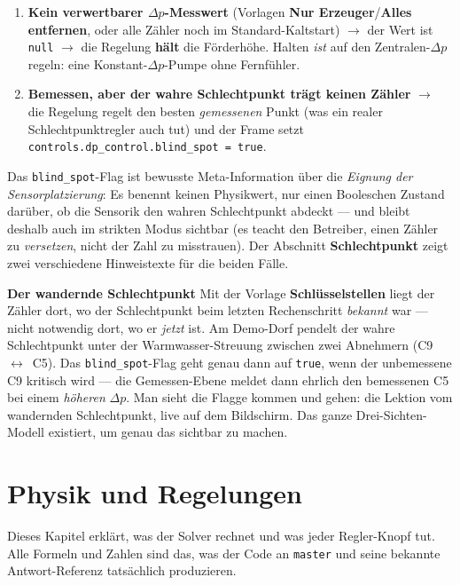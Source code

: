 \documentclass[11pt,a4paper,parskip=half]{scrreprt}
\newcommand{\ui}[1]{\textsf{\bfseries #1}}
\newenvironment{beispiel}[1][Beispiel]
  {\par\medskip{\color{bsp}\hrule height 0.8pt}\nopagebreak\smallskip
   \noindent\textbf{\textsf{\textcolor{bsp}{#1}}}\quad\ignorespaces}
  {\par\nopagebreak\smallskip{\color{bsp}\hrule height 0.8pt}\par\medskip}
\begin{document}
\begin{enumerate}[nosep]
  \item \textbf{Kein verwertbarer $\Delta p$-Messwert} (Vorlagen \ui{Nur
    Erzeuger}/\ui{Alles entfernen}, oder alle Zähler noch im Standard-Kaltstart)
    $\rightarrow$ der Wert ist \texttt{null} $\rightarrow$ die Regelung
    \textbf{hält} die Förderhöhe. Halten \emph{ist} \glqq auf den Zentralen-$\Delta p$
    regeln\grqq: eine Konstant-$\Delta p$-Pumpe ohne Fernfühler.
  \item \textbf{Bemessen, aber der wahre Schlechtpunkt trägt keinen Zähler}
    $\rightarrow$ die Regelung regelt den besten \emph{gemessenen} Punkt (was
    ein realer Schlechtpunktregler auch tut) und der Frame setzt
    \texttt{controls.dp\_control.blind\_spot~=~true}.
\end{enumerate}

Das \texttt{blind\_spot}-Flag ist bewusste Meta-Information über die
\emph{Eignung der Sensorplatzierung}: Es benennt keinen Physikwert, nur einen
Booleschen Zustand darüber, ob die Sensorik den wahren Schlechtpunkt abdeckt ---
und bleibt deshalb auch im strikten Modus sichtbar (es teacht den Betreiber,
einen Zähler zu \emph{versetzen}, nicht der Zahl zu misstrauen). Der Abschnitt
\ui{Schlechtpunkt} zeigt zwei verschiedene Hinweistexte für die beiden Fälle.

\begin{beispiel}[Der wandernde Schlechtpunkt]
Mit der Vorlage \ui{Schlüsselstellen} liegt der Zähler dort, wo der
Schlechtpunkt beim letzten Rechenschritt \emph{bekannt} war --- nicht
notwendig dort, wo er \emph{jetzt} ist. Am Demo-Dorf pendelt der wahre
Schlechtpunkt unter der Warmwasser-Streuung zwischen zwei Abnehmern (C9~$\leftrightarrow$~C5).
Das \texttt{blind\_spot}-Flag geht genau dann auf \texttt{true}, wenn der
unbemessene C9 kritisch wird --- die Gemessen-Ebene meldet dann ehrlich den
bemessenen C5 bei einem \emph{höheren} $\Delta p$. Man sieht die Flagge kommen
und gehen: die Lektion vom wandernden Schlechtpunkt, live auf dem Bildschirm.
Das ganze Drei-Sichten-Modell existiert, um genau das sichtbar zu machen.
\end{beispiel}

\chapter{Physik und Regelungen}
\label{ch:physik}

Dieses Kapitel erklärt, was der Solver rechnet und was jeder Regler-Knopf tut.
Alle Formeln und Zahlen sind das, was der Code an \texttt{master} und seine
bekannte Antwort-Referenz tatsächlich produzieren.
\end{document}
